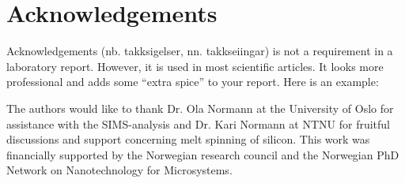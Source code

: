 \section*{Acknowledgements}


Acknowledgements (nb. takksigelser, nn. takkseiingar) is not a requirement in a laboratory report. However, it is used in most 
scientific articles. It looks more professional and adds some ``extra spice'' to your report. Here is an example: \par
The authors would like to thank Dr. Ola Normann at the
University of Oslo for assistance with the SIMS-analysis
and Dr. Kari Normann at NTNU for fruitful discussions
and support concerning melt spinning of silicon. This work
was financially supported by the Norwegian research council and the Norwegian PhD Network on Nanotechnology
for Microsystems.
